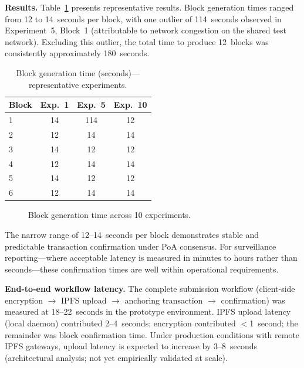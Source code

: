 \textbf{Results.} Table~\ref{tab:performance} presents representative results. Block generation times ranged from 12 to 14~seconds per block, with one outlier of 114~seconds observed in Experiment~5, Block~1 (attributable to network congestion on the shared test network). Excluding this outlier, the total time to produce 12~blocks was consistently approximately 180~seconds.

\begin{table}[!ht]
\caption{Block generation time (seconds)---representative experiments.}\label{tab:performance}
\begin{tabular*}{\columnwidth}{@{\extracolsep\fill}lccc@{}}
\toprule
Block & Exp.\ 1 & Exp.\ 5 & Exp.\ 10 \\
\midrule
1 & 14 & 114 & 12 \\
2 & 12 & 14 & 14 \\
3 & 14 & 12 & 12 \\
4 & 12 & 14 & 14 \\
5 & 14 & 12 & 12 \\
6 & 12 & 14 & 14 \\
\bottomrule
\end{tabular*}
\end{table}

\begin{figure}[!ht]
\centering
{}
\caption{Block generation time across 10 experiments.}\label{fig:performance}
\end{figure}

The narrow range of 12--14~seconds per block demonstrates stable and predictable transaction confirmation under PoA consensus. For surveillance reporting---where acceptable latency is measured in minutes to hours rather than seconds---these confirmation times are well within operational requirements.

\textbf{End-to-end workflow latency.} The complete submission workflow (client-side encryption $\rightarrow$ IPFS upload $\rightarrow$ anchoring transaction $\rightarrow$ confirmation) was measured at 18--22~seconds in the prototype environment. IPFS upload latency (local daemon) contributed 2--4~seconds; encryption contributed $<$1~second; the remainder was block confirmation time. Under production conditions with remote IPFS gateways, upload latency is expected to increase by 3--8~seconds (architectural analysis; not yet empirically validated at scale).


